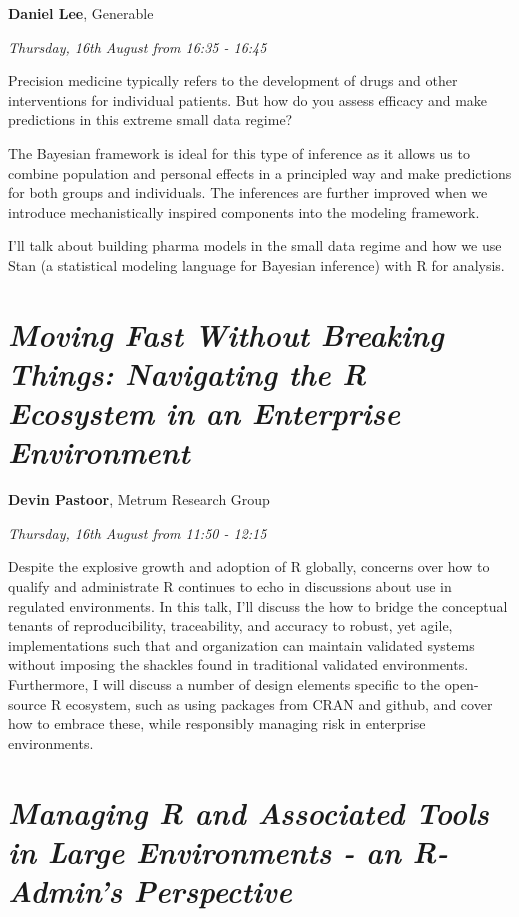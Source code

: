 \documentclass[]{book}
\theoremstyle{definition}
\theoremstyle{definition}
\theoremstyle{definition}
\theoremstyle{remark}
\begin{document}
\textbf{Daniel Lee}, Generable

\emph{Thursday, 16th August from 16:35 - 16:45}

Precision medicine typically refers to the development of drugs and
other interventions for individual patients. But how do you assess
efficacy and make predictions in this extreme small data regime?

The Bayesian framework is ideal for this type of inference as it allows
us to combine population and personal effects in a principled way and
make predictions for both groups and individuals. The inferences are
further improved when we introduce mechanistically inspired components
into the modeling framework.

I'll talk about building pharma models in the small data regime and how
we use Stan (a statistical modeling language for Bayesian inference)
with R for analysis.

\hypertarget{moving-fast-without-breaking-things-navigating-the-r-ecosystem-in-an-enterprise-environment}{%
\section{\texorpdfstring{\emph{Moving Fast Without Breaking Things:
Navigating the R Ecosystem in an Enterprise
Environment}}{Moving Fast Without Breaking Things: Navigating the R Ecosystem in an Enterprise Environment}}\label{moving-fast-without-breaking-things-navigating-the-r-ecosystem-in-an-enterprise-environment}}

\textbf{Devin Pastoor}, Metrum Research Group

\emph{Thursday, 16th August from 11:50 - 12:15}

Despite the explosive growth and adoption of R globally, concerns over
how to qualify and administrate R continues to echo in discussions about
use in regulated environments. In this talk, I'll discuss the how to
bridge the conceptual tenants of reproducibility, traceability, and
accuracy to robust, yet agile, implementations such that and
organization can maintain validated systems without imposing the
shackles found in traditional validated environments. Furthermore, I
will discuss a number of design elements specific to the open-source R
ecosystem, such as using packages from CRAN and github, and cover how to
embrace these, while responsibly managing risk in enterprise
environments.

\hypertarget{managing-r-and-associated-tools-in-large-environments---an-r-admins-perspective}{%
\section{\texorpdfstring{\emph{Managing R and Associated Tools in Large
Environments - an R-Admin's
Perspective}}{Managing R and Associated Tools in Large Environments - an R-Admin's Perspective}}\label{managing-r-and-associated-tools-in-large-environments---an-r-admins-perspective}}
\end{document}
